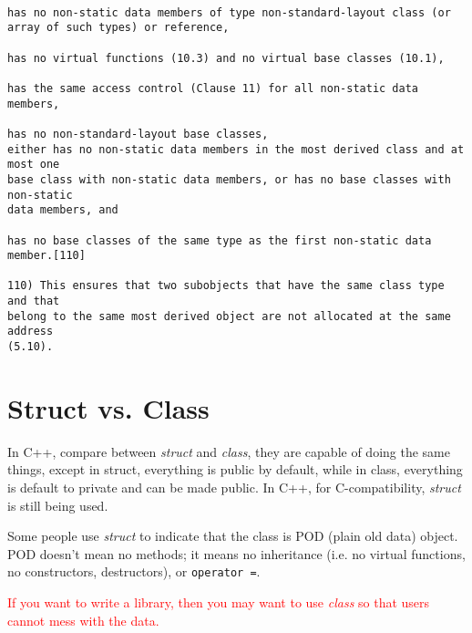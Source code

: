 \begin{verbatim}

has no non-static data members of type non-standard-layout class (or array of such types) or reference,

has no virtual functions (10.3) and no virtual base classes (10.1),

has the same access control (Clause 11) for all non-static data members,

has no non-standard-layout base classes,
either has no non-static data members in the most derived class and at most one
base class with non-static data members, or has no base classes with non-static
data members, and

has no base classes of the same type as the first non-static data member.[110]

110) This ensures that two subobjects that have the same class type and that
belong to the same most derived object are not allocated at the same address
(5.10).
\end{verbatim}

\section{Struct vs. Class}
\label{sec:struct_class}

In C++, compare between {\it struct} and {\it class}, they are capable of doing
the same things, except in struct, everything is public by default, while in
class, everything is default to private and can be made public. In C++, for
C-compatibility, {\it struct} is still being used.

Some people use {\it struct} to indicate that the class is POD (plain old data)
object. POD doesn't mean no methods; it means no inheritance (i.e. no virtual
functions, no constructors, destructors), or \verb!operator =!.


\textcolor{red}{If you want to write a library, then you may want to use {\it
class} so that users cannot mess with the data.}

